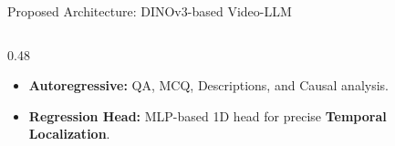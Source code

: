 \documentclass[aspectratio=169]{beamer}
\begin{document}
\begin{frame}{Proposed Architecture: DINOv3-based Video-LLM}
\begin{columns}[T]
\begin{column}{0.48\textwidth}
            \begin{tcolorbox}[colback=blue!5,colframe=blue!75,title=Task-Specific Heads, fonttitle=\bfseries]
                \small
                \begin{itemize}
                    \item \textbf{Autoregressive:} QA, MCQ, Descriptions, and Causal analysis.
                    \item \textbf{Regression Head:} MLP-based 1D head for precise \textbf{Temporal Localization}.
                \end{itemize}
            \end{tcolorbox}
        \end{column}
    \end{columns}
\end{frame}
\end{document}
